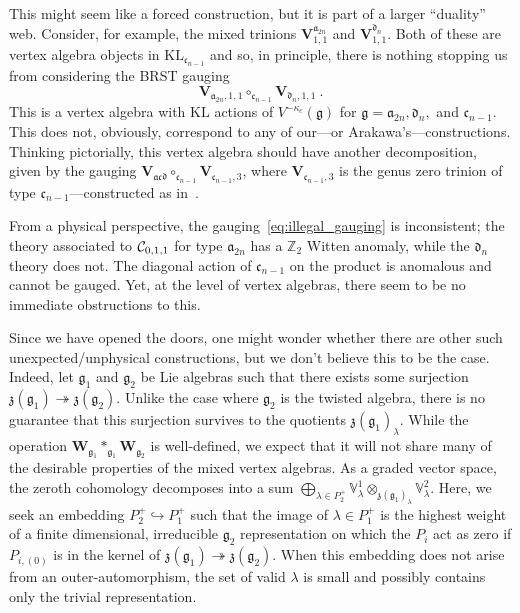 \documentclass[a4paper]{article}
\def\IV{\mathbb{V}}
\def\IZ{\mathbb{Z}}
\def\CC{{\cal C}}
\def\af{\mathfrak{a}}
\def\ccf{\mathfrak{c}}
\def\df{\mathfrak{d}}
\def\gf{\mathfrak{g}}
\def \zf{\mathfrak{z}}
\def \KL{\mathrm{KL}}
\def\W{\mathbf{W}}
\def\V{\mathbf{V}}
\begin{document}
This might seem like a forced construction, but it is part of a larger ``duality'' web. Consider, for example, the mixed trinions $\V_{1,1}^{\af_{2n}}$ and $\V_{1,1}^{\df_n}$. Both of these are vertex algebra objects in $\KL_{{\mathfrak c}_{n-1}}$ and so, in principle, there is nothing stopping us from considering the BRST gauging
\begin{equation}\label{eq:illegal_gauging}
	\V_{\af_{2n},1,1}\circ_{{\mathfrak c}_{n-1}}\V_{\df_n,1,1}~.
\end{equation}
This is a vertex algebra with $\KL$ actions of $V^{-\kappa_c}(\gf)$ for $\gf=\mathfrak{a}_{2n},\mathfrak{d}_{n},$ and $\mathfrak{c}_{n-1}$. This does not, obviously, correspond to any of our---or Arakawa's---constructions. Thinking pictorially, this vertex algebra should have another decomposition, given by the gauging $\V_{\af\ccf\df}\circ_{{\mathfrak c}_{n-1}} \V_{{\mathfrak c}_{n-1},3}$, where $\V_{{\mathfrak c}_{n-1},3}$ is the genus zero trinion of type ${\mathfrak c}_{n-1}$---constructed as in~\cite{Arakawa:2018egx}.

From a physical perspective, the gauging~\eqref{eq:illegal_gauging} is inconsistent; the theory associated to $\CC_{0,1,1}$ for type $\af_{2n}$ has a $\IZ_2$ Witten anomaly, while the $\df_n$ theory does not. The diagonal action of $\mathfrak{c}_{n-1}$ on the product is anomalous and cannot be gauged. Yet, at the level of vertex algebras, there seem to be no immediate obstructions to this.

Since we have opened the doors, one might wonder whether there are other such unexpected/unphysical constructions, but we don't believe this to be the case. Indeed, let $\gf_1$ and $\gf_2$ be Lie algebras such that there exists some surjection $\zf(\gf_1)\twoheadrightarrow \zf(\gf_2)$. Unlike the case where $\gf_2$ is the twisted algebra, there is no guarantee that this surjection survives to the quotients $\zf(\gf_1)_\lambda$. While the operation $\W_{\gf_1}\ast_{\gf_1}\W_{\gf_2}$ is well-defined, we expect that it will not share many of the desirable properties of the mixed vertex algebras. As a graded vector space, the zeroth cohomology decomposes into a sum $\bigoplus_{\lambda\in P^+_2} \IV_{\lambda}^1\otimes_{\zf(\gf_1)_\lambda}\IV_{\lambda}^2$. Here, we seek an embedding $P^+_{2}\hookrightarrow P_1^+$ such that the image of $\lambda\in P^+_1$ is the highest weight of a finite dimensional, irreducible $\gf_2$ representation on which the $P_{i}$ act as zero if $P_{i,(0)}$ is in the kernel of $\zf(\gf_1)\twoheadrightarrow \zf(\gf_2)$. When this embedding does not arise from an outer-automorphism, the set of valid $\lambda$ is small and possibly contains only the trivial representation.
\end{document}
